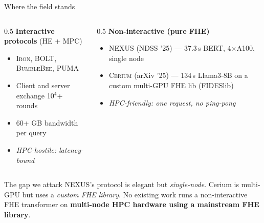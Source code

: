 \documentclass[aspectratio=169]{beamer}
\begin{document}
\begin{frame}{Where the field stands}
  \begin{columns}[T]
    \begin{column}{0.5\textwidth}
      \textbf{Interactive protocols} (HE + MPC)
      \begin{itemize}
        \item \textsc{Iron}, \textsc{BOLT}, \textsc{BumbleBee}, \textsc{PUMA}
        \item Client and server exchange 10$^4$+ rounds
        \item 60+ GB bandwidth per query
        \item \color{mutedGray}\emph{HPC-hostile: latency-bound}
      \end{itemize}
    \end{column}
    \begin{column}{0.5\textwidth}
      \textbf{Non-interactive (pure FHE)}
      \begin{itemize}
        \item \textsc{NEXUS} (NDSS '25) — 37.3\,s BERT, 4$\times$A100,
              \alert{single node}
        \item \textsc{Cerium} (arXiv '25) — 134\,s Llama3-8B on
              a custom multi-GPU FHE lib (FIDESlib)
        \item \color{mutedGray}\emph{HPC-friendly: one request, no ping-pong}
      \end{itemize}
    \end{column}
  \end{columns}
  \vspace{1em}
  \begin{alertblock}{The gap we attack}
    \small
    NEXUS's protocol is elegant but \emph{single-node}. Cerium is multi-GPU but
    uses a \emph{custom FHE library}. No existing work runs a non-interactive
    FHE transformer on \textbf{multi-node HPC hardware using a mainstream FHE library}.
  \end{alertblock}
\end{frame}
\end{document}
